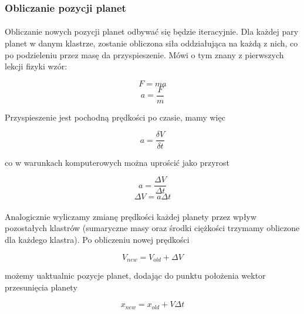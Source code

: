 \subsubsection{Obliczanie pozycji planet}

\paragraph{}

Obliczanie nowych pozycji planet odbywać się będzie iteracyjnie. Dla każdej pary planet w danym klastrze, zostanie obliczona siła oddziałująca na każdą z nich, co po podzieleniu przez masę da przyspieszenie. Mówi o tym znany z pierwszych lekcji fizyki wzór:

\begin{displaymath}
	F = ma
\end{displaymath}
\begin{displaymath}
	a = \frac{F}{m}
\end{displaymath}

Przyspieszenie jest pochodną prędkości po czasie, mamy więc

\begin{displaymath}
	a = \frac{\delta V}{\delta t}
\end{displaymath}

co w warunkach komputerowych można uprościć jako przyrost

\begin{displaymath}
	a = \frac{\Delta V}{\Delta t}
\end{displaymath}
\begin{displaymath}
	\Delta V = a\Delta t
\end{displaymath}

\paragraph{}
Analogicznie wyliczamy zmianę prędkości każdej planety przez wpływ pozostałych klastrów (sumaryczne masy oraz środki ciężkości trzymamy obliczone dla każdego klastra). Po obliczeniu nowej prędkości

\begin{displaymath}
	V_{new} = V_{old} + \Delta V
\end{displaymath}

możemy uaktualnic pozycje planet, dodając do punktu położenia wektor przesunięcia planety

\begin{displaymath}
	x_{new} = x_{old} + V \Delta t
\end{displaymath}

